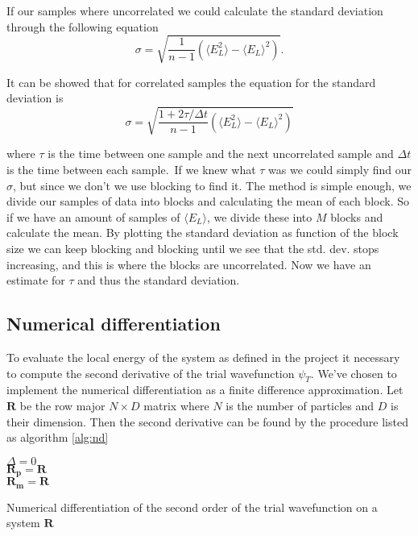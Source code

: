 If our samples where uncorrelated we could calculate the standard deviation through the following equation 
$$\sigma = \sqrt{\frac{1}{n - 1} \left(\langle E_L^2\rangle - \langle E_L \rangle^2\right)}.$$

It can be showed that for correlated samples the equation for the standard deviation is
$$\sigma = \sqrt{\frac{1 + 2 \tau / \Delta t}{n - 1} \left(\langle E_L^2\rangle - \langle E_L \rangle^2\right)}$$

where $\tau$ is the time between one sample and the next uncorrelated sample and $\Delta t$ is the time between each sample.\
If we knew what $\tau$ was we could simply find our $\sigma$, but since we don't we use blocking to find it. The method is simple enough, we divide our samples of data into blocks and calculating the mean of each block. So if we have an amount of samples of $\langle E_L \rangle$, we divide these into $M$ blocks and calculate the mean. By plotting the standard deviation as function of the block size we can keep blocking and blocking until we see that the std. dev. stops increasing, and this is where the blocks are uncorrelated. Now we have an estimate for $\tau$ and thus the standard deviation.


\subsection{Numerical differentiation}
To evaluate the local energy of the system as defined in the project it necessary to compute the second derivative of the trial wavefunction $\psi_T$. We've chosen to implement the numerical differentiation as a finite difference approximation. Let $\mathbf{R}$ be the row major $N \times D$ matrix where $N$ is the number of particles and $D$ is their dimension. Then the second derivative can be found by the procedure listed as algorithm \ref{alg:nd}

\begin{algorithm}
\BlankLine
$\Delta = 0$ \\
$\mathbf{R_p} = \mathbf{R}$\\
$\mathbf{R_m} = \mathbf{R}$\\
\BlankLine
{}
\BlankLine
\caption{Numerical differentiation of the second order of the trial wavefunction on a system $\mathbf{R}$}\label{alg:nd}
\end{algorithm} 

